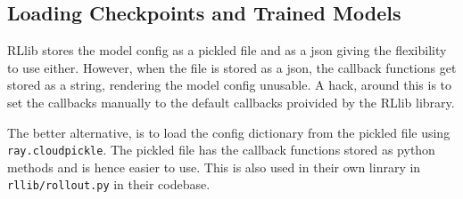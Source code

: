 \documentclass{article}
\begin{document}
\subsection{Loading Checkpoints and Trained Models}
RLlib stores the model config as a pickled file and as a json giving the flexibility to use either. However, when the file is stored as a json, the callback functions get stored as a string, rendering the model config unusable. A hack, around this is to set the callbacks manually to the default callbacks proivided by the RLlib library.

The better alternative, is to load the config dictionary from the pickled file using \lstinline{ray.cloudpickle}. The pickled file has the callback functions stored as python methods and is hence easier to use. This is also used in their own linrary in \lstinline{rllib/rollout.py} in their codebase. 

% 
% 
\end{document}

